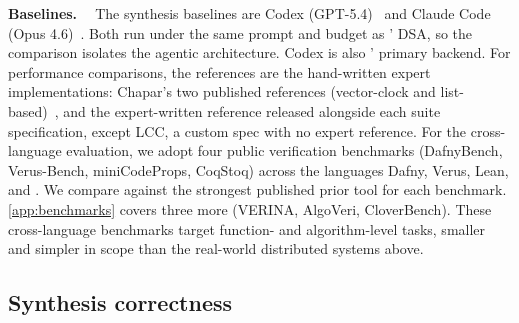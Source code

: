 \textbf{Baselines. \ }
The synthesis baselines are Codex (GPT-5.4)~\cite{codex} and Claude Code (Opus 4.6)~\cite{claude-code}. Both run under the same prompt and budget as \sys{}' DSA, so the comparison isolates the agentic architecture. Codex is also \sys{}' primary backend. 
For performance comparisons, the references are the hand-written expert implementations: 
Chapar's two published references (vector-clock and list-based)~\cite{chapar}, and the expert-written reference released alongside each \sys{} suite specification, except LCC, a custom spec with no expert reference.
% 
For the cross-language evaluation, 
we adopt four public verification benchmarks (DafnyBench, Verus-Bench, miniCodeProps, CoqStoq) across the languages Dafny, Verus, Lean, and \coq{}. 
We compare against the strongest published prior tool for each benchmark.
\cref{app:benchmarks} covers three more (VERINA, AlgoVeri, CloverBench). These cross-language benchmarks target function- and algorithm-level tasks, smaller and simpler in scope than the real-world distributed systems above.




\subsection{Synthesis correctness}
\label{sec:eval-synthesis}

